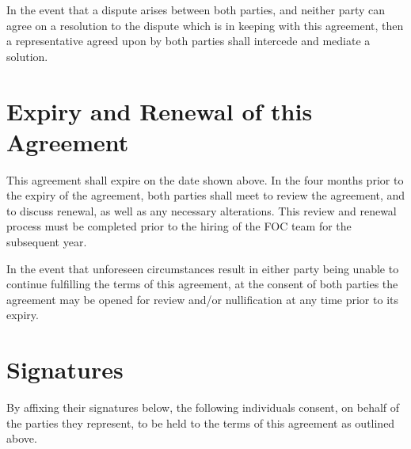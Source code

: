 \documentclass[12pt, letterpaper]{article}
\begin{document}
In the event that a dispute arises between both parties, and neither party can agree on a resolution to the dispute which is in keeping with this agreement, then a representative agreed upon by both parties shall intercede and mediate a solution.

\section{Expiry and Renewal of this Agreement}

This agreement shall expire on the date shown above. In the four months prior to the expiry of the agreement, both parties shall meet to review the agreement, and to discuss renewal, as well as any necessary alterations. This review and renewal process must be completed prior to the hiring of the FOC team for the subsequent year.

In the event that unforeseen circumstances result in either party being unable to continue fulfilling the terms of this agreement, at the consent of both parties the agreement may be opened for review and/or nullification at any time prior to its expiry.

\newpage
\section{Signatures}

By affixing their signatures below, the following individuals consent, on behalf of the parties they represent, to be held to the terms of this agreement as outlined above.





\end{document}

